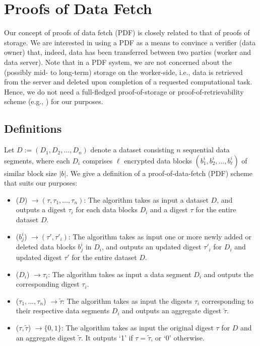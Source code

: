 \section{Proofs of Data Fetch} \label{sect:pdf}

Our concept of proofs of data fetch (PDF) is closely related to that of proofs of storage.
We are interested in using a PDF as a means to convince a verifier (data owner) that, indeed, data has been transferred between two parties (worker and data server).
Note that in a PDF system, we are not concerned about the (possibly mid- to long-term) storage on the worker-side, i.e., data is retrieved from the server and deleted upon completion of a requested computational task.
Hence, we do not need a full-fledged proof-of-storage or proof-of-retrievability scheme (e.g., \cite{JK07,AKK09,SW13}) for our purposes.


\subsection{Definitions} \label{sect:pdf-definition}

Let $D := (D_1,D_2,\dotsc,D_n)$ denote a dataset consisting $n$ sequential data segments, where each $D_i$ comprises $\ell$ encrypted data blocks $(b^i_1,b^i_2,\dotsc,b^i_{\ell})$ of similar block size $|b|$.
We give a definition of a proof-of-data-fetch (PDF) scheme that suits our purposes:
\begin{itemize}
\item \Setup($D$) $\rightarrow (\tau,\tau_1,\dotsc,\tau_n)$: The algorithm takes as input a dataset $D$, and outputs a digest $\tau_i$ for each data blocks $D_i$ and a digest $\tau$ for the entire dataset $D$.

\item \Update($b^i_j$) $\rightarrow (\tau',\tau'_i)$: The algorithm takes as input one or more newly added or deleted data blocks $b^i_j$ in $D_i$, and outputs an updated digest $\tau'_i$ for $D_i$ and updated digest $\tau'$ for the entire dataset $D$.

\item \Prove($D_i$) $\rightarrow \tau_i$: The algorithm takes as input a data segment $D_i$ and outputs the corresponding digest $\tau_i$.

\item \Aggregate($\tau_1,\dotsc,\tau_n$) $\rightarrow \tilde{\tau}$: The algorithm takes as input the digests $\tau_i$ corresponding to their respective data segments $D_i$ and outputs an aggregate digest $\tilde{\tau}$.

\item \Verify($\tau, \tilde{\tau}$) $\rightarrow \{0,1\}$: The algorithm takes as input the original digest $\tau$ for $D$ and an aggregate digest $\tilde{\tau}$. It outputs `1' if $\tau=\tilde{\tau}$, or `0' otherwise.
\end{itemize}

